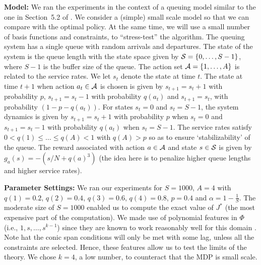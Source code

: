 \documentclass[12pt,draftcls,onecolumn]{IEEEtran}
\begin{document}
\textbf{Model:} We ran the experiments in the context of a queuing model similar to the one in Section~5.2 of \cite{ALP}. We consider a (simple) small scale model so that we can compare with the optimal policy.
At the same time, we will use a small number of basis functions and constraints, to ``stress-test'' the algorithm.
The queuing system has a single queue with random arrivals and departures. 
The state of the system is the queue length with the state space given by $\S=\{0,\ldots,S-1\}$, 
where $S-1$ is the buffer size of the queue. 
The action set $\A=\{1,\ldots,A\}$ is related to the service rates. 
We let $s_t$ denote the state at time $t$. 
The state at time $t+1$ when action $a_t \in \A$ is chosen is given by $s_{t+1}= s_{t}+1$ with probability $p$, 
$s_{t+1}= s_{t}-1$ with probability $q(a_t)$ and $s_{t+1}= s_t$, with probability $(1-p-q(a_t))$. 
For states $s_t=0$ and $s_t=S-1$, the system dynamics is given by $s_{t+1}= s_{t}+1$ 
with probability $p$ when $s_t=0$ and $s_{t+1}=s_t-1$ with probability $q(a_t)$ when $s_t=S-1$. 
The service rates satisfy $0<q(1)\leq \ldots\leq q(A)<1$ with $q(A)>p$ so as to ensure `stabilizability' of the queue.
The reward associated with  action $a \in \A$ and state $s\in \S$ is given by $g_a(s)=-(s/N+q(a)^3)$ 
(the idea here is to penalize higher queue lengths and higher service rates). 

\textbf{Parameter Settings:} 
We ran our experiments for $S=1000$, $A=4$ with $q(1)=0.2$, $q(2)=0.4$, $q(3)=0.6$, $q(4)=0.8$, $p=0.4$ 
and $\alpha=1-\frac{1}{S}$.
The moderate size of $S=1000$ enabled us to compute the exact value of $J^*$ (the most expensive part of the computation).
We made use of polynomial features in $\Phi$ (i.e., $1,s,\ldots,s^{k-1}$)
since they are known to work reasonably well for this domain \cite{ALP}.
Note hat the conic span conditions will only be met with some lag, unless all the constraints are selected.
Hence, these features allow us to test the limits of the theory. 
We chose $k=4$, a low number, to counteract  that the MDP is small scale. 
\end{document}
